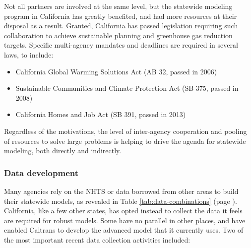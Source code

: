 Not all partners are involved at the same level, but the statewide modeling program in California has greatly benefited, and had more resources at their disposal as a result. Granted, California has passed legislation requiring such collaboration to achieve sustainable planning and greenhouse gas reduction targets. Specific multi-agency mandates and deadlines are required in several laws, to include:

\begin{itemize}
\item California Global Warming Solutions Act (AB 32, passed in 2006)
\item Sustainable Communities and Climate Protection Act (SB 375, passed in 2008)
\item California Homes and Job Act (SB 391, passed in 2013)
\end{itemize}

Regardless of the motivations, the level of inter-agency cooperation and pooling of resources to solve large problems is helping to drive the agenda for statewide modeling, both directly and indirectly.

\subsubsection{Data development}

Many agencies rely on the NHTS or data borrowed from other areas to build their statewide models, as revealed in Table \ref{tab:data-combinations} (page \pageref{tab:data-combinations}). California, like a few other states, has opted instead to collect the data it feels are required for robust models. Some have no parallel in other places, and have enabled Caltrans to develop the advanced model that it currently uses. Two of the most important recent data collection activities
included:

